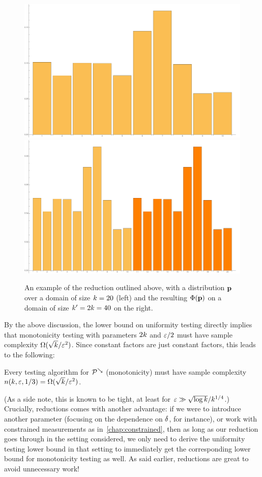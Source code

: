 \begin{figure}[htbp]\centering
\includegraphics[width=.45\textwidth]{figures/fig-reduction-uniformity}\hfill
\includegraphics[width=.45\textwidth]{figures/fig-reduction-uniformity2}
\caption{An example of the reduction outlined above, with a distribution $\mathbf{p}$ over a domain of size $k=20$ (left) and the resulting $\Phi(\mathbf{p})$ on a domain of size $k'=2k=40$ on the right.\label{fig:reduction:monotonicity:example}}
\end{figure}
By the above discussion, the lower bound on uniformity testing directly implies that monotonicity testing with parameters $2k$ and $\varepsilon/2$ must have sample complexity $\Omega(\sqrt{k}/\varepsilon^2)$. Since constant factors are just constant factors, this leads to the following:
\begin{theorem}
	\label{theo:lb:testing:monotonicity}
Every testing algorithm for $\mathcal{P}^{\searrow}$ (monotonicity) must have sample complexity $n(k,\varepsilon,1/3) = \Omega(\sqrt{k}/\varepsilon^2)$.
\end{theorem}
\noindent(As a side note, this is known to be tight, at least for $\varepsilon \gg \sqrt{\log k}/k^{1/4}$.) Crucially, reductions comes with another advantage: if we were to introduce another parameter (focusing on the dependence on $\delta$, for instance), or work with constrained measurements as in~\cref{chap:constrained}, then as long as our reduction goes through in the setting considered, we only need to derive the uniformity testing lower bound in that setting to immediately get the corresponding lower bound for monotonicity testing as well. As said earlier, reductions are great to avoid unnecessary work!

